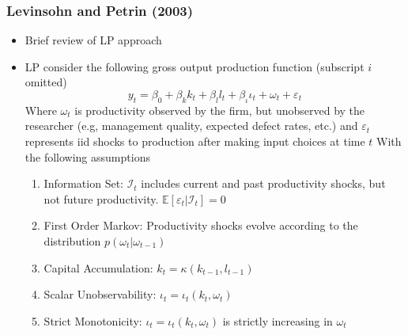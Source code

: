 \documentclass{beamer}
\begin{document}

\begin{frame}
\frametitle{Levinsohn and Petrin (2003)}
\begin{itemize}
	\item Brief review of LP approach
	\item LP consider the following gross output production function (subscript $i$ omitted)
	\begin{equation}
	y_{t}=\beta_{0}+\beta_{k}k_{t}+\beta_{l}l_{t}+\beta_{\iota}\iota_{t}+\omega_{t}+\varepsilon_{t}
	\end{equation}
	Where $\omega_{t}$ is productivity observed by the firm, but unobserved by the researcher (e.g, management quality, expected defect rates, etc.) and $\varepsilon_{t}$ represents iid shocks to production after making input choices at time $t$
	With the following assumptions
	\medskip
	\begin{enumerate}
		\item Information Set: $\mathcal{I}_{t}$ includes current and past productivity shocks, but not future productivity. $\mathbb{E}[\varepsilon_{t}|\mathcal{I}_{t}]=0$
		\item First Order Markov: Productivity shocks evolve according to the distribution $p(\omega_{t}|\omega_{t-1})$
		\item Capital Accumulation: $k_{t}=\kappa(k_{t-1}, l_{t-1})$
		\item Scalar Unobservability: $\iota_{t}=\iota_{t}(k_{t}, \omega_{t})$
		\item Strict Monotonicity: $\iota_{t}=\iota_{t}(k_{t}, \omega_{t})$ is strictly increasing in $\omega_{t}$
	\end{enumerate}
\end{itemize}
\end{frame}

\end{document}
